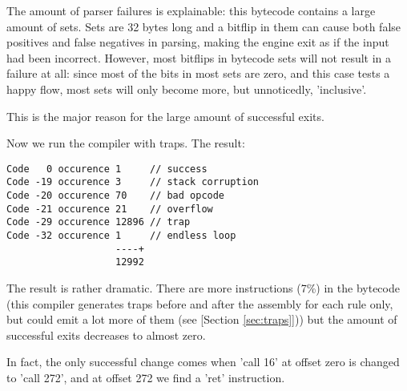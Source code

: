 The amount of parser failures is explainable: this bytecode contains
a large amount of sets. Sets are 32 bytes long and a bitflip in them
can cause both false positives and false negatives in parsing, making
the engine exit as if the input had been incorrect. However, most bitflips
in bytecode sets will not result in a failure at all: since most of the
bits in most sets are zero, and this case tests a happy flow, most sets
will only become more, but unnoticedly, 'inclusive'.

This is the major reason for the large amount of successful exits.

Now we run the compiler with traps. The result:

\begin{myquote}
\begin{verbatim}
Code   0 occurence 1     // success
Code -19 occurence 3     // stack corruption
Code -20 occurence 70    // bad opcode
Code -21 occurence 21    // overflow
Code -29 occurence 12896 // trap
Code -32 occurence 1     // endless loop
                   ----+
                   12992

\end{verbatim}
\end{myquote}

The result is rather dramatic. There are more instructions (7\%) in the bytecode
(this compiler generates traps before and after the assembly for each rule only,
but could emit a lot more of them (see [Section \ref{sec:traps}]))
but the amount of successful exits decreases to almost zero.

In fact, the only successful change comes when 'call 16' at offset zero
is changed to 'call 272', and at offset 272 we find a 'ret' instruction.
